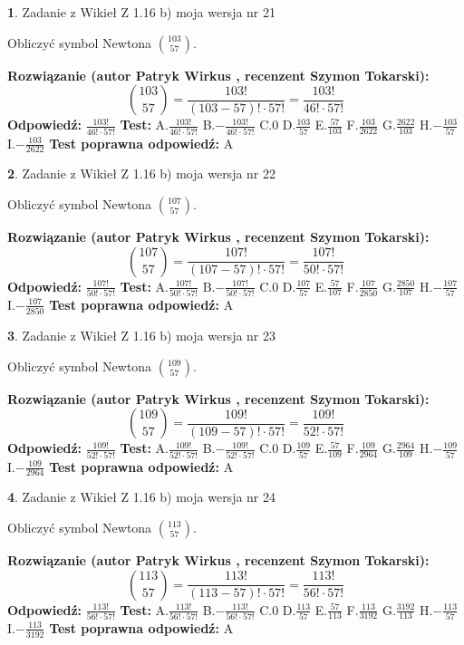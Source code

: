 \documentclass[12pt, a4paper]{article}
\theoremstyle{definition} %
\newtheorem{zad}{}
\newcommand{\zadStart}[1]{\begin{zad}#1\newline}
\newcommand{\zadStop}{\end{zad}}
\newcommand{\rozwStart}[2]{\noindent \textbf{Rozwiązanie (autor #1 , recenzent #2): }\newline}
\newcommand{\rozwStop}{\newline}
\newcommand{\odpStart}{\noindent \textbf{Odpowiedź:}\newline}
\newcommand{\odpStop}{\newline}
\newcommand{\testStart}{\noindent \textbf{Test:}\newline}
\newcommand{\testStop}{\newline}
\newcommand{\kluczStart}{\noindent \textbf{Test poprawna odpowiedź:}\newline}
\newcommand{\kluczStop}{\newline}
\begin{document}
\zadStart{Zadanie z Wikieł Z 1.16 b) moja wersja nr 21}

Obliczyć symbol Newtona ${103 \choose 57}$.
\zadStop
\rozwStart{Patryk Wirkus}{Szymon Tokarski}
$${103 \choose 57} = \frac{103!}{(103-57)! \cdot 57!} = \frac{103!}{46! \cdot 57!}$$
\rozwStop
\odpStart
$\frac{103!}{46! \cdot 57!}$
\odpStop
\testStart
A.$\frac{103!}{46! \cdot 57!}$ B.$-\frac{103!}{46! \cdot 57!}$ C.$0$ D.$\frac{103}{57}$ E.$\frac{57}{103}$
F.$\frac{103}{2622}$ G.$\frac{2622}{103}$
H.$-\frac{103}{57}$
I.$-\frac{103}{2622}$
\testStop
\kluczStart
A
\kluczStop



\zadStart{Zadanie z Wikieł Z 1.16 b) moja wersja nr 22}

Obliczyć symbol Newtona ${107 \choose 57}$.
\zadStop
\rozwStart{Patryk Wirkus}{Szymon Tokarski}
$${107 \choose 57} = \frac{107!}{(107-57)! \cdot 57!} = \frac{107!}{50! \cdot 57!}$$
\rozwStop
\odpStart
$\frac{107!}{50! \cdot 57!}$
\odpStop
\testStart
A.$\frac{107!}{50! \cdot 57!}$ B.$-\frac{107!}{50! \cdot 57!}$ C.$0$ D.$\frac{107}{57}$ E.$\frac{57}{107}$
F.$\frac{107}{2850}$ G.$\frac{2850}{107}$
H.$-\frac{107}{57}$
I.$-\frac{107}{2850}$
\testStop
\kluczStart
A
\kluczStop



\zadStart{Zadanie z Wikieł Z 1.16 b) moja wersja nr 23}

Obliczyć symbol Newtona ${109 \choose 57}$.
\zadStop
\rozwStart{Patryk Wirkus}{Szymon Tokarski}
$${109 \choose 57} = \frac{109!}{(109-57)! \cdot 57!} = \frac{109!}{52! \cdot 57!}$$
\rozwStop
\odpStart
$\frac{109!}{52! \cdot 57!}$
\odpStop
\testStart
A.$\frac{109!}{52! \cdot 57!}$ B.$-\frac{109!}{52! \cdot 57!}$ C.$0$ D.$\frac{109}{57}$ E.$\frac{57}{109}$
F.$\frac{109}{2964}$ G.$\frac{2964}{109}$
H.$-\frac{109}{57}$
I.$-\frac{109}{2964}$
\testStop
\kluczStart
A
\kluczStop



\zadStart{Zadanie z Wikieł Z 1.16 b) moja wersja nr 24}

Obliczyć symbol Newtona ${113 \choose 57}$.
\zadStop
\rozwStart{Patryk Wirkus}{Szymon Tokarski}
$${113 \choose 57} = \frac{113!}{(113-57)! \cdot 57!} = \frac{113!}{56! \cdot 57!}$$
\rozwStop
\odpStart
$\frac{113!}{56! \cdot 57!}$
\odpStop
\testStart
A.$\frac{113!}{56! \cdot 57!}$ B.$-\frac{113!}{56! \cdot 57!}$ C.$0$ D.$\frac{113}{57}$ E.$\frac{57}{113}$
F.$\frac{113}{3192}$ G.$\frac{3192}{113}$
H.$-\frac{113}{57}$
I.$-\frac{113}{3192}$
\testStop
\kluczStart
A
\kluczStop
\end{document}
